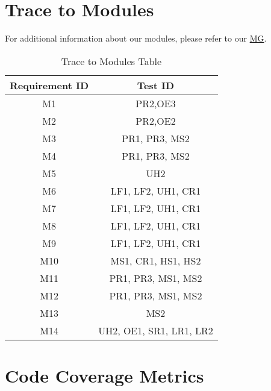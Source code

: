 \documentclass[12pt, titlepage]{article}
\begin{document}
\section{Trace to Modules}	
For additional information about our modules, please refer to our \href{https://github.com/RezaJodeiri/CXR-Capstone/blob/main/docs/Design/SoftArchitecture/MG.pdf}{MG}.	
\begin{table}[h!]
  \centering
  \begin{tabular}{|c|c|}
  \hline
  \textbf{Requirement ID} & \textbf{Test ID} \\ \hline
  M1           & PR2,OE3            \\ \hline
  M2           & PR2,OE2            \\ \hline
  M3           & PR1, PR3, MS2      \\ \hline
  M4           & PR1, PR3, MS2      \\ \hline
  M5           & UH2                \\ \hline
  M6           & LF1, LF2, UH1, CR1 \\ \hline
  M7           & LF1, LF2, UH1, CR1 \\ \hline
  M8           & LF1, LF2, UH1, CR1 \\ \hline
  M9           & LF1, LF2, UH1, CR1 \\ \hline
  M10          & MS1, CR1, HS1, HS2 \\ \hline
  M11          & PR1, PR3, MS1, MS2 \\ \hline
  M12          & PR1, PR3, MS1, MS2 \\ \hline
  M13          & MS2                \\ \hline
  M14          & UH2, OE1, SR1, LR1, LR2 \\ \hline
  \end{tabular}
  \caption{Trace to Modules Table} 
  \end{table}
\section{Code Coverage Metrics}






\newpage{}
\end{document}
